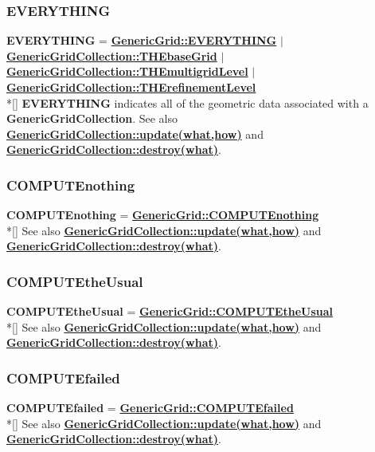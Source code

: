 \documentclass{article}
\begin{document}
  \subsubsection{EVERYTHING}
  \label{GenericGridCollection::EVERYTHING}
    \textbf{EVERYTHING}
    =      {\bf{}\hyperref{GenericGrid::EVERYTHING}{GenericGrid::EVERYTHING \rm(\S}{)}{GenericGrid::EVERYTHING}}
    $\mid$ {\bf{}\hyperref{THEbaseGrid}{THEbaseGrid \rm(\S}{)}{GenericGridCollection::THEbaseGrid}}
    $\mid$ {\bf{}\hyperref{THEmultigridLevel}{THEmultigridLevel \rm(\S}{)}{GenericGridCollection::THEmultigridLevel}}
    $\mid$ {\bf{}\hyperref{THErefinementLevel}{THErefinementLevel \rm(\S}{)}{GenericGridCollection::THErefinementLevel}} \\*[\parskip]
    \textbf{EVERYTHING} indicates all of the geometric data associated with a \textbf{GenericGridCollection}.
    See also {\bf{}\hyperref{update(what,how)}{update(what,how) \rm(\S}{)}{GenericGridCollection::update(what,how)}}
    and {\bf{}\hyperref{destroy(what)}{destroy(what) \rm(\S}{)}{GenericGridCollection::destroy(what)}}.

  \subsubsection{COMPUTEnothing}
  \label{GenericGridCollection::COMPUTEnothing}
    \textbf{COMPUTEnothing} = 
    {\bf{}\hyperref{GenericGrid::COMPUTEnothing}{GenericGrid::COMPUTEnothing \rm(\S}{)}{GenericGrid::COMPUTEnothing}} \\*[\parskip]
    See also {\bf{}\hyperref{update(what,how)}{update(what,how) \rm(\S}{)}{GenericGridCollection::update(what,how)}}
    and {\bf{}\hyperref{destroy(what)}{destroy(what) \rm(\S}{)}{GenericGridCollection::destroy(what)}}.

  \subsubsection{COMPUTEtheUsual}
  \label{GenericGridCollection::COMPUTEtheUsual}
    \textbf{COMPUTEtheUsual} =
    {\bf{}\hyperref{GenericGrid::COMPUTEtheUsual}{GenericGrid::COMPUTEtheUsual \rm(\S}{)}{GenericGrid::COMPUTEtheUsual}} \\*[\parskip]
    See also {\bf{}\hyperref{update(what,how)}{update(what,how) \rm(\S}{)}{GenericGridCollection::update(what,how)}}
    and {\bf{}\hyperref{destroy(what)}{destroy(what) \rm(\S}{)}{GenericGridCollection::destroy(what)}}.

  \subsubsection{COMPUTEfailed}
  \label{GenericGridCollection::COMPUTEfailed}
    \textbf{COMPUTEfailed} =
    {\bf{}\hyperref{GenericGrid::COMPUTEfailed}{GenericGrid::COMPUTEfailed \rm(\S}{)}{GenericGrid::COMPUTEfailed}} \\*[\parskip]
    See also {\bf{}\hyperref{update(what,how)}{update(what,how) \rm(\S}{)}{GenericGridCollection::update(what,how)}}
    and {\bf{}\hyperref{destroy(what)}{destroy(what) \rm(\S}{)}{GenericGridCollection::destroy(what)}}.
\end{document}
